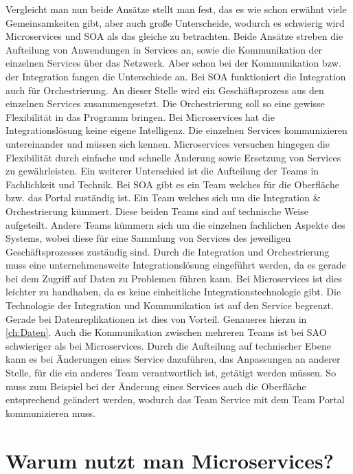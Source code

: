 Vergleicht man nun beide Ansätze stellt man fest, das es wie schon erwähnt viele Gemeinsamkeiten gibt, aber auch große Unterscheide, wodurch es schwierig wird Microservices und SOA als das gleiche zu betrachten.\newline
Beide Ansätze streben die Aufteilung von Anwendungen in Services an, sowie die Kommunikation der einzelnen Services über das Netzwerk.\newline
Aber schon bei der Kommunikation bzw. der Integration fangen die Unterschiede an. Bei SOA funktioniert die Integration auch für Orchestrierung. An dieser Stelle wird ein Geschäftsprozess aus den einzelnen Services zusammengesetzt. Die Orchestrierung soll so eine gewisse Flexibilität in das Programm bringen. Bei Microservices hat die Integrationslösung keine eigene Intelligenz. Die einzelnen Services kommunizieren untereinander und müssen sich kennen. Microservices versuchen hingegen die Flexibilität durch einfache und schnelle Änderung sowie Ersetzung von Services zu gewährleisten.\newline
Ein weiterer Unterschied ist die Aufteilung der Teams in Fachlichkeit und Technik.
Bei SOA gibt es ein Team welches für die Oberfläche bzw. das Portal zuständig ist. Ein Team welches sich um die Integration \& Orchestrierung kümmert. Diese beiden Teams sind auf technische Weise aufgeteilt. Andere Teams kümmern sich um die einzelnen fachlichen Aspekte des Systems, wobei diese für eine Sammlung von Services des jeweiligen Geschäftsprozesses zuständig sind. Durch die Integration und Orchestrierung muss eine unternehmensweite Integrationslösung eingeführt werden, da es gerade bei dem Zugriff auf Daten zu Problemen führen kann. Bei Microservices ist dies leichter zu handhaben, da es keine einheitliche Integrationstechnologie gibt. Die Technologie der Integration und Kommunikation ist auf den Service begrenzt. Gerade bei Datenreplikationen ist dies von Vorteil. Genaueres hierzu in \ref{ch:Daten}.\newline
Auch die Kommunikation zwischen mehreren Teams ist bei SAO schwieriger als bei Microservices. Durch die Aufteilung auf technischer Ebene kann es bei Änderungen eines Service dazuführen, das Anpassungen an anderer Stelle, für die ein anderes Team verantwortlich ist, getätigt werden müssen. So muss zum Beispiel bei der Änderung eines Services auch die Oberfläche entsprechend geändert werden, wodurch das Team Service mit dem Team Portal kommunizieren muss.\cite{microservices}

\chapter{Warum nutzt man Microservices?}

